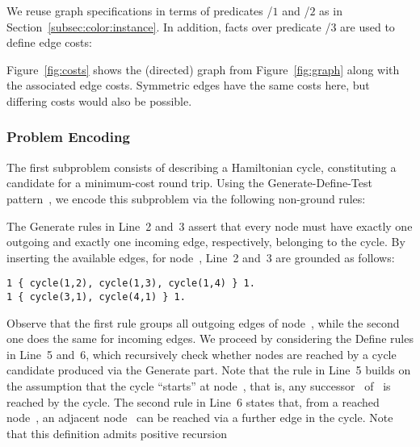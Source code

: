 We reuse graph specifications in terms of predicates /$1$ and /$2$
as in Section~\ref{subsec:color:instance}.
In addition, facts over predicate /$3$ are used to define edge costs:
%

%
Figure~\ref{fig:costs} shows the (directed) graph from Figure~\ref{fig:graph}
along with the associated edge costs.
Symmetric edges have the same costs here,
but differing costs would also be possible.


\subsubsection{Problem Encoding}\label{subsec:tsp:encoding}

The first subproblem consists of describing a Hamiltonian cycle,
constituting a candidate for a minimum-cost round trip.
Using the Generate-Define-Test pattern~\cite{lifschitz02a},
we encode this subproblem via the following non-ground rules:
%

%
The Generate rules in Line~2 and~3 assert that every node must have
exactly one outgoing and exactly one incoming edge, respectively,
belonging to the cycle.
By inserting the available edges, for node~,
Line~2 and~3 are grounded as follows:%
%
\begin{lstlisting}[numbers=none]
1 { cycle(1,2), cycle(1,3), cycle(1,4) } 1.
1 { cycle(3,1), cycle(4,1) } 1.
\end{lstlisting}
%
Observe that the first rule groups all outgoing edges of node~,
while the second one does the same for incoming edges.
We proceed by considering the Define rules in Line~5 and~6,
which recursively check whether nodes are reached by a cycle candidate
produced via the Generate part.
Note that the rule in Line~5 builds on the assumption that the cycle
``starts'' at node~, that is,
any successor~ of~ is reached by the cycle.
The second rule in Line~6 states that, from a reached node~,
an adjacent node~ can be reached via a further edge in the cycle.
Note that this definition admits positive recursion
